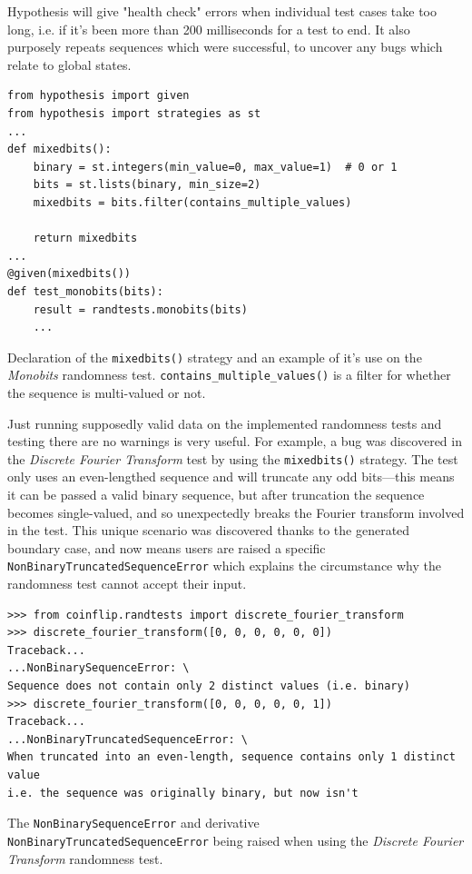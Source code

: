 \documentclass[11pt]{article}
\begin{document}
Hypothesis will give "health check" errors when individual test cases take too long, i.e. if it's been more than 200 milliseconds for a test to end. It also purposely repeats sequences which were successful, to uncover any bugs which relate to global states.

\begin{listing}[htbp]
\begin{verbatim}
from hypothesis import given
from hypothesis import strategies as st
...
def mixedbits():
    binary = st.integers(min_value=0, max_value=1)  # 0 or 1
    bits = st.lists(binary, min_size=2)
    mixedbits = bits.filter(contains_multiple_values)

    return mixedbits
...
@given(mixedbits())
def test_monobits(bits):
    result = randtests.monobits(bits)
    ...
\end{verbatim}
\caption[\texttt{mixedbits()} definition and usage]{\label{code:mixedbits}Declaration of the \texttt{mixedbits()} strategy and an example of it's use on the \emph{Monobits} randomness test. \texttt{contains\_multiple\_values()} is a filter for whether the sequence is multi-valued or not.}
\end{listing}
\FloatBarrier

Just running supposedly valid data on the implemented randomness tests and testing there are no warnings is very useful. For example, a bug was discovered in the \emph{Discrete Fourier Transform} test by using the \texttt{mixedbits()} strategy. The test only uses an even-lengthed sequence and will truncate any odd bits---this means it can be passed a valid binary sequence, but after truncation the sequence becomes single-valued, and so unexpectedly breaks the Fourier transform involved in the test. This unique scenario was discovered thanks to the generated boundary case, and now means users are raised a specific \texttt{NonBinaryTruncatedSequenceError} which explains the circumstance why the randomness test cannot accept their input.

\begin{listing}[htbp]
  \begin{verbatim}
>>> from coinflip.randtests import discrete_fourier_transform
>>> discrete_fourier_transform([0, 0, 0, 0, 0, 0])
Traceback...
...NonBinarySequenceError: \
Sequence does not contain only 2 distinct values (i.e. binary)
>>> discrete_fourier_transform([0, 0, 0, 0, 0, 1])
Traceback...
...NonBinaryTruncatedSequenceError: \
When truncated into an even-length, sequence contains only 1 distinct value
i.e. the sequence was originally binary, but now isn't
  \end{verbatim}
  \caption[Interactive session showcasing \texttt{NonBinaryTruncatedSequenceError}]{The \texttt{NonBinarySequenceError} and derivative \texttt{NonBinaryTruncatedSequenceError} being raised when using the \emph{Discrete Fourier Transform} randomness test.}
\end{listing}
\end{document}
